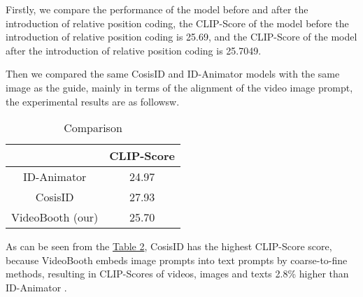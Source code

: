 Firstly, we compare the performance of the model before and after the introduction of relative position coding, the CLIP-Score of the model before the introduction of relative position coding is 25.69, and the CLIP-Score of the model after the introduction of relative position coding is 25.7049.

Then we compared the same CosisID and ID-Animator models with the same image as the guide, mainly in terms of the alignment of the video image prompt, the experimental results are as followsw.

\begin{table}
    \centering
    \label{Comparison}
    \caption{Comparison}
    \begin{tabular}{|c|c|}
        \hline
            & CLIP-Score \\
        \hline
            ID-Animator & 24.97 \\
        \hline
            CosisID & 27.93 \\
        \hline
            VideoBooth (our) & 25.70 \\
        \hline
    \end{tabular}
\end{table}

As can be seen from the \hyperref[Comparison]{Table 2}, CosisID \cite{yuan2024identity} has the highest CLIP-Score score, because VideoBooth embeds image prompts into text prompts by coarse-to-fine methods, resulting in CLIP-Scores of videos, images and texts 2.8\% higher than ID-Animator \cite{he2024id}.